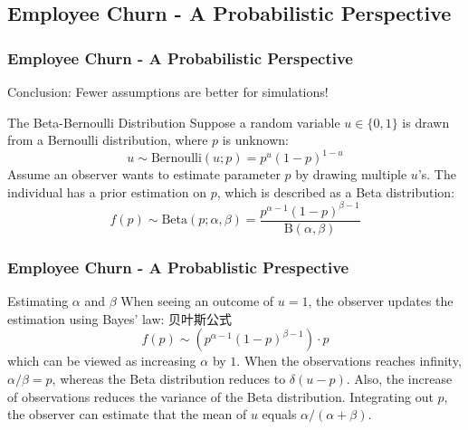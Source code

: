 \documentclass{beamer}
\begin{document}
\begin{CJK*}{UTF8}{gbsn}
\subsection{Employee Churn - A Probabilistic Perspective}

\begin{frame}
\frametitle{Employee Churn - A Probabilistic Perspective}
Conclusion: Fewer assumptions are better for simulations!
\begin{block}{The Beta-Bernoulli Distribution}
Suppose a random variable $u\in \{0,1\}$ is drawn from a Bernoulli distribution, where $p$ is unknown:
\begin{equation}
u \sim \mathrm{Bernoulli}(u;p)=p^u(1-p)^{1-u}
\end{equation}
Assume an observer wants to estimate parameter $p$ by drawing multiple $u$'s. The individual has a prior estimation on $p$, which is described as a Beta distribution:
\begin{equation}
f(p)\sim \mathrm{Beta}(p;\alpha, \beta) = \frac{p^{\alpha-1}(1-p)^{\beta-1}}{\mathrm{B}(\alpha, \beta)}
\end{equation}
\end{block}
\end{frame}

\begin{frame}
\frametitle{Employee Churn - A Probablistic Prespective}
\begin{block}{Estimating $\alpha$ and $\beta$}
When seeing an outcome of $u=1$, the observer updates the estimation using Bayes' law: 贝叶斯公式
\begin{equation}
f(p)\sim (p^{\alpha - 1}(1-p)^{\beta-1})\cdot p
\end{equation}
which can be viewed as increasing $\alpha$ by $1$. When the observations reaches infinity, $\alpha/\beta=p$, whereas the Beta distribution reduces to $\delta(u-p)$. Also, the increase of observations reduces the variance of the Beta distribution. Integrating out $p$, the observer can estimate that the mean of $u$ equals $\alpha/(\alpha+\beta)$.

\end{block}
\end{frame}


\end{CJK*}
\end{document}
